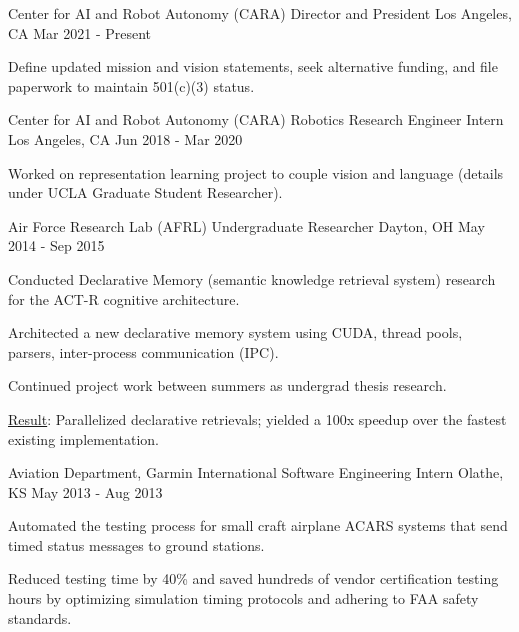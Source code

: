 


\begin{cventries}

\cventry
{Center for AI and Robot Autonomy (CARA)}
{Director and President}
{Los Angeles, CA}
{Mar 2021 - Present}
{
\begin{cvitems}
\item Define updated mission and vision statements, seek alternative funding, and file paperwork to maintain 501(c)(3) status.
\end{cvitems}
}

\cventry
{Center for AI and Robot Autonomy (CARA)}
{Robotics Research Engineer Intern}
{Los Angeles, CA}
{Jun 2018 - Mar 2020}
{
\begin{cvitems}
\item Worked on representation learning project to couple vision and language (details under UCLA Graduate Student Researcher).
\end{cvitems}
}

\cventry
{Air Force Research Lab (AFRL)}
{Undergraduate Researcher}
{Dayton, OH}
{May 2014 - Sep 2015}
{
\begin{cvitems}
\item Conducted Declarative Memory (semantic knowledge retrieval system) research for the ACT-R cognitive architecture.
\item Architected a new declarative memory system using CUDA, thread pools, parsers, inter-process communication (IPC).
\item Continued project work between summers as undergrad thesis research.
\item \underline{Result}: Parallelized declarative retrievals; yielded a 100x speedup over the fastest existing implementation.
\end{cvitems}
}

\cventry
{Aviation Department, Garmin International}
{Software Engineering Intern}
{Olathe, KS}
{May 2013 - Aug 2013}
{
\begin{cvitems}
\item Automated the testing process for small craft airplane ACARS systems that send timed status messages to ground stations.
\item Reduced testing time by 40\% and saved hundreds of vendor certification testing hours by optimizing simulation timing protocols and adhering to FAA safety standards.
\end{cvitems}
}

\end{cventries}